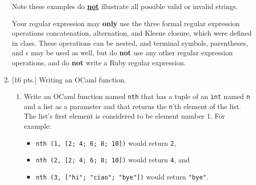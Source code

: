 \documentclass[11pt]{article}
\begin{document}
\begin{enumerate}
          \vspace{-2.5mm}

          Note these examples do \textbf{\underline{not}} illustrate all
          possible valid or invalid strings.

          Your regular expression may \textbf{only} use the three formal
          regular expression operations concatenation, alternation, and
          Kleene closure, which were defined in class.  These operations can
          be nested, and terminal symbols, parentheses, and $\epsilon$ may
          be used as well, but do \textbf{not} use any other regular
          expression operations, and do \textbf{not} write a Ruby regular
          expression.

         \pagebreak


    \item {[16 pts.]} Writing an OCaml function.

          \vspace{-2.75mm}

          \begin{enumerate}

            \addtolength{\itemsep}{3in}

            \item Write an OCaml function named \texttt{nth} that has a
                  tuple of an \texttt{int} named \texttt{n} and a list as a
                  parameter and that returns the \texttt{n}'th element of
                  the list.  The list's first element is considered to be
                  element number 1.  For example:

                  \vspace{-.75mm}

                  \begin{itemize}

                    \addtolength{\itemsep}{-.25mm}

                    \item \texttt{nth (1, [2; 4; 6; 8; 10])} would return
                          \texttt{2},

                    \item \texttt{nth (2, [2; 4; 6; 8; 10])} would return
                          \texttt{4}, and

                    \item \texttt{nth (3, ["hi"; "ciao"; "bye"])} would
                          return \texttt{"bye"}.


\end{itemize}
\end{enumerate}
\end{enumerate}
\end{document}
